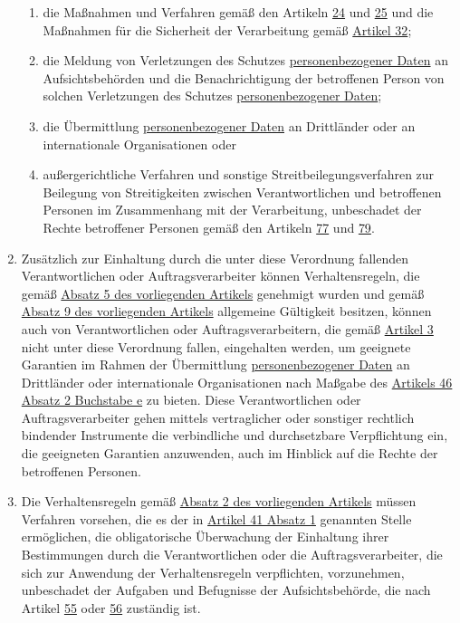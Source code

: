 \begin{enumerate}
\begin{enumerate}
    \item die Maßnahmen und Verfahren gemäß den Artikeln \hyperref[ch:24]{24} und \hyperref[ch:25]{25} und die Maßnahmen
     für die Sicherheit der Verarbeitung gemäß \hyperref[ch:32]{Artikel 32};
    \label{itm:40-2h}

    \item die Meldung von Verletzungen des Schutzes \hyperref[itm:04-1]{personenbezogener Daten} an Aufsichtsbehörden und die
     Benachrichtigung der betroffenen Person von solchen Verletzungen des Schutzes \hyperref[itm:04-1]{personenbezogener Daten};
    \label{itm:40-2i}

    \item die Übermittlung \hyperref[itm:04-1]{personenbezogener Daten} an Drittländer oder an internationale Organisationen oder
    \label{itm:40-2j}

    \item außergerichtliche Verfahren und sonstige Streitbeilegungsverfahren zur Beilegung von Streitigkeiten zwischen
     Verantwortlichen und betroffenen Personen im Zusammenhang mit der Verarbeitung, unbeschadet der Rechte betroffener
     Personen gemäß den Artikeln \hyperref[ch:77]{77} und \hyperref[ch:79]{79}.
    \label{itm:40-2k}

  \end{enumerate}

  \item Zusätzlich zur Einhaltung durch die unter diese Verordnung fallenden Verantwortlichen oder Auftragsverarbeiter
   können Verhaltensregeln, die gemäß \hyperref[itm:40-5]{Absatz 5 des vorliegenden Artikels} genehmigt wurden und
   gemäß \hyperref[itm:40-9]{Absatz 9 des vorliegenden Artikels} allgemeine Gültigkeit besitzen, können auch von
   Verantwortlichen oder Auftragsverarbeitern, die gemäß \hyperref[ch:3]{Artikel 3} nicht unter diese Verordnung
   fallen, eingehalten werden, um geeignete Garantien im Rahmen der Übermittlung \hyperref[itm:04-1]{personenbezogener Daten} an Drittländer
   oder internationale Organisationen nach Maßgabe des \hyperref[itm:46-2e]{Artikels 46 Absatz 2 Buchstabe e} zu
   bieten. Diese Verantwortlichen oder Auftragsverarbeiter gehen mittels vertraglicher oder sonstiger rechtlich
   bindender Instrumente die verbindliche und durchsetzbare Verpflichtung ein, die geeigneten Garantien anzuwenden,
   auch im Hinblick auf die Rechte der betroffenen Personen.
  \label{itm:40-3}

  \item Die Verhaltensregeln gemäß \hyperref[itm:40-2]{Absatz 2 des vorliegenden Artikels} müssen Verfahren vorsehen,
   die es der in \hyperref[itm:41-2]{Artikel 41 Absatz 1} genannten Stelle ermöglichen, die obligatorische Überwachung
   der Einhaltung ihrer Bestimmungen durch die Verantwortlichen oder die Auftragsverarbeiter, die sich zur Anwendung
   der Verhaltensregeln verpflichten, vorzunehmen, unbeschadet der Aufgaben und Befugnisse der Aufsichtsbehörde, die
   nach Artikel \hyperref[ch:55]{55} oder \hyperref[ch:56]{56} zuständig ist.
  \label{itm:40-4}


\end{enumerate}
